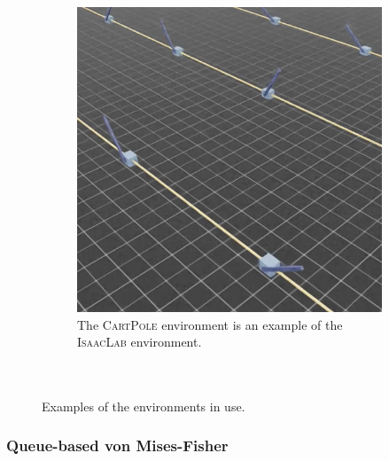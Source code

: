 \documentclass[10pt]{article} %
\begin{document}
\begin{figure}
\begin{subfigure}[b]{0.32\textwidth}
    \includegraphics[width=\textwidth]{figures/isaac.png}
    \caption{The \textsc{CartPole} environment is an example of the \textsc{IsaacLab} environment.\\\textcolor{white}{.}\\\textcolor{white}{.}\\}
    \label{fig:sample-env-isaac}
  \end{subfigure}
  \caption{Examples of the environments in use.}
  \vspace{-12pt}
  \label{fig:environmnents}
\end{figure}

\subsubsection{Queue-based von Mises-Fisher}
\end{document}
